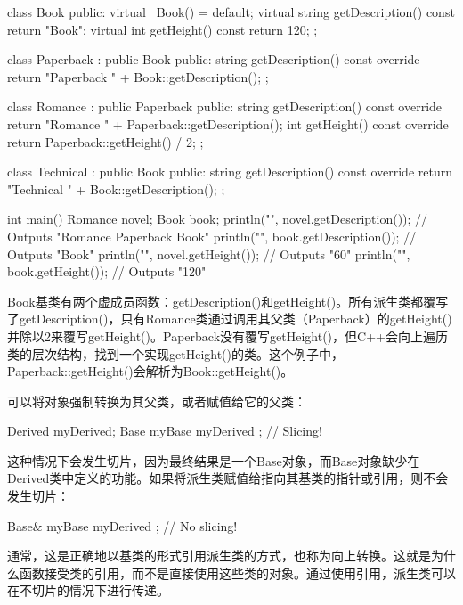 \begin{cpp}
class Book
{
    public:
        virtual ~Book() = default;
        virtual string getDescription() const { return "Book"; }
        virtual int getHeight() const { return 120; }
};

class Paperback : public Book
{
    public:
        string getDescription() const override {
            return "Paperback " + Book::getDescription();
        }
};

class Romance : public Paperback
{
    public:
        string getDescription() const override {
            return "Romance " + Paperback::getDescription();
        }
        int getHeight() const override { return Paperback::getHeight() / 2; }
};

class Technical : public Book
{
    public:
        string getDescription() const override {
            return "Technical " + Book::getDescription();
        }
};

int main()
{
    Romance novel;
    Book book;
    println("{}", novel.getDescription()); // Outputs "Romance Paperback Book"
    println("{}", book.getDescription()); // Outputs "Book"
    println("{}", novel.getHeight()); // Outputs "60"
    println("{}", book.getHeight()); // Outputs "120"
}
\end{cpp}

Book基类有两个虚成员函数：getDescription()和getHeight()。所有派生类都覆写了getDescription()，只有Romance类通过调用其父类（Paperback）的getHeight()并除以2来覆写getHeight()。Paperback没有覆写getHeight()，但C++会向上遍历类的层次结构，找到一个实现getHeight()的类。这个例子中，Paperback::getHeight()会解析为Book::getHeight()。


可以将对象强制转换为其父类，或者赋值给它的父类：

\begin{cpp}
Derived myDerived;
Base myBase { myDerived }; // Slicing!
\end{cpp}

这种情况下会发生切片，因为最终结果是一个Base对象，而Base对象缺少在Derived类中定义的功能。如果将派生类赋值给指向其基类的指针或引用，则不会发生切片：

\begin{cpp}
Base& myBase { myDerived }; // No slicing!
\end{cpp}

通常，这是正确地以基类的形式引用派生类的方式，也称为向上转换。这就是为什么函数接受类的引用，而不是直接使用这些类的对象。通过使用引用，派生类可以在不切片的情况下进行传递。

